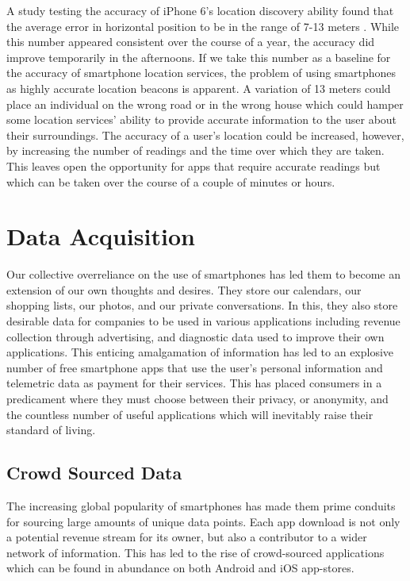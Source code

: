A study testing the accuracy of iPhone 6's location discovery ability found that the average error in horizontal position to be in the range of 7-13 meters \cite{Merry2019}. While this number appeared consistent over the course of a year, the accuracy did improve temporarily in the afternoons. If we take this number as a baseline for the accuracy of smartphone location services, the problem of using smartphones as highly accurate location beacons is apparent. A variation of 13 meters could place an individual on the wrong road or in the wrong house which could hamper some location services' ability to provide accurate information to the user about their surroundings. The accuracy of a user's location could be increased, however, by increasing the number of readings and the time over which they are taken. This leaves open the opportunity for apps that require accurate readings but which can be taken over the course of a couple of minutes or hours.


\section{Data Acquisition}
Our collective overreliance on the use of smartphones has led them to become an extension of our own thoughts and desires. They store our calendars, our shopping lists, our photos, and our private conversations. In this, they also store desirable data for companies to be used in various applications including revenue collection through advertising, and diagnostic data used to improve their own applications. This enticing amalgamation of information has led to an explosive number of free smartphone apps that use the user's personal information and telemetric data as payment for their services. This has placed consumers in a predicament where they must choose between their privacy, or anonymity, and the countless number of useful applications which will inevitably raise their standard of living. 

\subsection{Crowd Sourced Data}
The increasing global popularity of smartphones has made them prime conduits for sourcing large amounts of unique data points. Each app download is not only a potential revenue stream for its owner, but also a contributor to a wider network of information. This has led to the rise of crowd-sourced applications which can be found in abundance on both Android and iOS app-stores.

